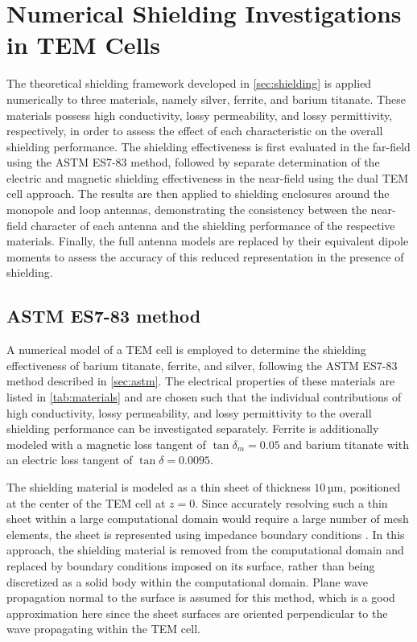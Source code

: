 \section{Numerical Shielding Investigations in TEM Cells}\label{sec:shielding-sim}

The theoretical shielding framework developed in \cref{sec:shielding} is applied 
numerically to three materials, namely silver, ferrite, and barium titanate. 
These materials possess high conductivity, lossy permeability, and lossy 
permittivity, respectively, in order to assess the effect of each characteristic 
on the overall shielding performance. The shielding effectiveness is first 
evaluated in the far-field using the ASTM ES7-83 method, followed by separate 
determination of the electric and magnetic shielding effectiveness in the near-field 
using the dual TEM cell approach. The results are then applied to shielding 
enclosures around the monopole and loop antennas, demonstrating the consistency 
between the near-field character of each antenna and the shielding performance of 
the respective materials. Finally, the full antenna models are replaced by their 
equivalent dipole moments to assess the accuracy of this reduced representation 
in the presence of shielding.

\subsection{ASTM ES7-83 method}\label{sec:astm-sim}


A numerical model of a TEM cell is employed to determine the shielding effectiveness 
of barium titanate, ferrite, and silver, following the ASTM ES7-83 method described 
in \cref{sec:astm}. The electrical properties of these materials are listed in 
\autoref{tab:materials} and are chosen such that the individual contributions of high 
conductivity, lossy permeability, and lossy permittivity to the overall shielding 
performance can be investigated separately. Ferrite is additionally modeled with a 
magnetic loss tangent of $\tan \delta_m = 0.05$ and barium titanate with an electric 
loss tangent of $\tan \delta = 0.0095$.

The shielding material is modeled as a thin sheet of thickness $10\,$µm, positioned 
at the center of the TEM cell at $z = 0$. Since accurately resolving such a thin 
sheet within a large computational domain would require a large number 
of mesh elements, the sheet is represented using impedance boundary conditions 
\cite{1430946}. In this approach, the shielding material is removed from the 
computational domain and replaced by boundary conditions imposed on its surface, rather than being discretized as a solid body within 
the computational domain.
Plane wave propagation normal to the surface is assumed for this method, which is a 
good approximation here since the sheet surfaces are oriented perpendicular to the 
wave propagating within the TEM cell.


